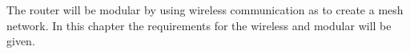 The router will be modular by using wireless communication as to create a mesh network. In this chapter the requirements for the wireless and modular will be given.


